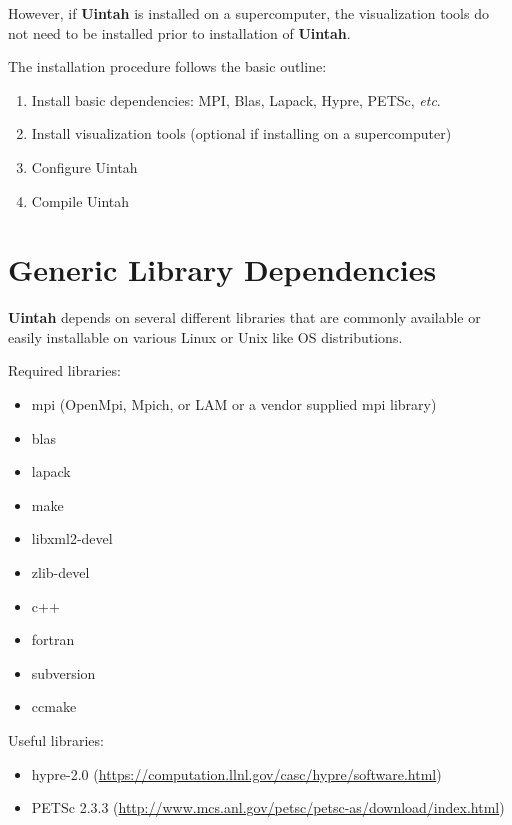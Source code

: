 \documentclass[12pt]{article}
\begin{document}
However, if \textbf{Uintah} is installed on a supercomputer, the
visualization tools do not need to be installed prior to installation
of \textbf{Uintah}.

The installation procedure follows the basic outline:

\begin{enumerate}

\item Install basic dependencies: MPI, Blas, Lapack, Hypre, PETSc, \emph{etc}.

\item Install visualization tools (optional if installing on a supercomputer)

\item Configure Uintah

\item Compile Uintah


\end{enumerate}


\section{Generic Library Dependencies}

\textbf{Uintah} depends on several different libraries that are commonly
available or easily installable on various Linux or Unix like OS
distributions.  

Required libraries:
\begin{itemize}
\item mpi (OpenMpi, Mpich, or LAM or a vendor supplied mpi library)
\item blas
\item lapack
\item make
\item libxml2-devel
\item zlib-devel
\item c++
\item fortran
\item subversion
\item ccmake

\end{itemize}

Useful libraries:
\begin{itemize}
\item hypre-2.0 (\url{https://computation.llnl.gov/casc/hypre/software.html})
\item PETSc 2.3.3 (\url{http://www.mcs.anl.gov/petsc/petsc-as/download/index.html})
\end{itemize}
\end{document}
